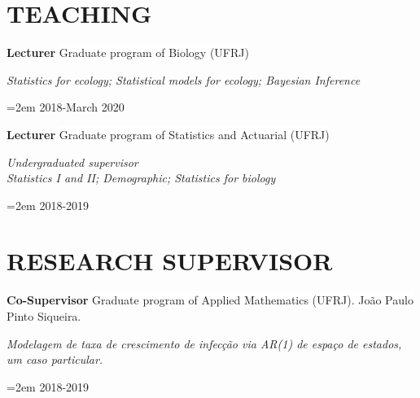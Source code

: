 \documentclass[paper=a4,fontsize=11pt]{scrartcl}	 			%
\renewcommand{\refname}{PUBLICATIONS}
\newcommand{\sepspace}{\vspace*{1em}}			%
\newcommand{\NewPart}[1]{\section*{\uppercase{#1}}}
\newcommand{\EducationEntry}[4]{
		\noindent \textbf{#1} \hfill 					%
		\colorbox{White}{%
			\parbox{10em}{%
			\hfill\color{Black}#2}} \par				%
		\noindent \textit{#3} \par					%
		\noindent\hangindent=2em\hangafter=0 \small #4 	%
		\normalsize \par}
\newcommand{\WorkEntry}[4]{						%
		\noindent \textbf{#1} \hfill 					%
		\colorbox{White}{\color{Black}#2} \par		%
		\noindent \textit{#3} \par					%
		\noindent\hangindent=2em\hangafter=0 \small #4 	%
		\normalsize \par}
\begin{document}
%
\nocite{*}




%

%



\NewPart{Teaching}{}
\WorkEntry{Lecturer}{Graduate  program of Biology (UFRJ) }{Statistics for ecology; Statistical models for ecology; Bayesian Inference}{2018-March 2020}
\sepspace

\WorkEntry{Lecturer}{Graduate  program of Statistics and Actuarial (UFRJ) }{Undergraduated supervisor \\ Statistics I and II; Demographic; Statistics for biology}{2018-2019}
\sepspace


\NewPart{Research Supervisor}{}
\WorkEntry{Co-Supervisor}{Graduate  program of Applied Mathematics (UFRJ). João Paulo Pinto Siqueira.}{Modelagem de taxa de crescimento de infecção via AR(1) de espaço de estados, um caso particular.}{2018-2019}
\sepspace
\end{document}
